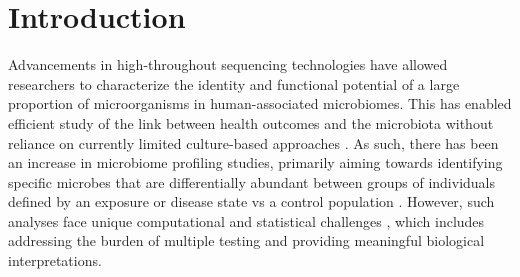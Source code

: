 
\section{Introduction}

Advancements in high-throughout sequencing technologies have allowed researchers to characterize the identity and functional potential of a large proportion of microorganisms in human-associated microbiomes. This has enabled efficient study of the link between health outcomes and the microbiota without reliance on currently limited culture-based approaches \cite{lagier2016culture}. As such, there has been an increase in microbiome profiling studies, primarily aiming towards identifying specific microbes that are differentially abundant between groups of individuals defined by an exposure or disease state vs a control population \cite{zhang2019advancing}. However, such analyses face unique computational and statistical challenges \cite{li2019statistical}, which includes addressing the burden of multiple testing and providing meaningful biological interpretations.  

